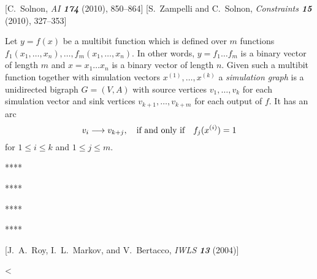 [C.\ Solnon, {\sl AI\/ \bf 174} (2010), 850--864]  [S.\ Zampelli and C.\ Solnon, {\sl Constraints\/ \bf 15} (2010), 327--353]

\medskip{}  Let $y=f(x)$ be a multibit
function which is defined over $m$ functions $f_1(x_1,\dots,x_n), \dots,
f_m(x_1,\dots,x_n)$.  In other words, $y=f_1\dots f_m$ is a binary vector of
length $m$ and $x=x_1\dots x_n$ is a binary vector of length $n$.  Given such a
multibit function together with simulation vectors $x^{(1)},\dots, x^{(k)}$ a
{\it simulation graph\/} is a unidirected bigraph $G=(V,A)$ with source vertices
$v_1,\dots,v_k$ for each simulation vector and sink vertices
$v_{k+1}, \dots, v_{k+m}$ for each output of $f$.  It has an arc
$$ v_i \longrightarrow v_{k+j}, \quad \hbox{if and only if} \quad f_j(x^{(i)})=1 $$
for $1\le i\le k$ and $1\le j\le m$.

\centerline{****}


\centerline{****}


\centerline{****}


\centerline{****}

[J.\ A.\ Roy, I.\ L.\ Markov, and V.\ Bertacco, {\sl IWLS\/ \bf 13} (2004)]


\bye
<